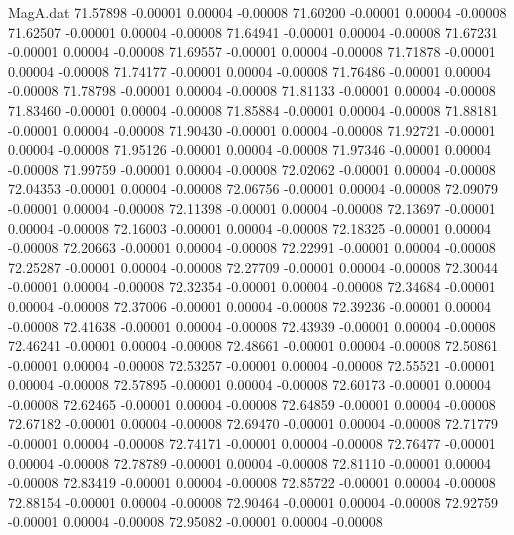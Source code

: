 \begin{filecontents}{MagA.dat}
  71.57898   -0.00001    0.00004   -0.00008
  71.60200   -0.00001    0.00004   -0.00008
  71.62507   -0.00001    0.00004   -0.00008
  71.64941   -0.00001    0.00004   -0.00008
  71.67231   -0.00001    0.00004   -0.00008
  71.69557   -0.00001    0.00004   -0.00008
  71.71878   -0.00001    0.00004   -0.00008
  71.74177   -0.00001    0.00004   -0.00008
  71.76486   -0.00001    0.00004   -0.00008
  71.78798   -0.00001    0.00004   -0.00008
  71.81133   -0.00001    0.00004   -0.00008
  71.83460   -0.00001    0.00004   -0.00008
  71.85884   -0.00001    0.00004   -0.00008
  71.88181   -0.00001    0.00004   -0.00008
  71.90430   -0.00001    0.00004   -0.00008
  71.92721   -0.00001    0.00004   -0.00008
  71.95126   -0.00001    0.00004   -0.00008
  71.97346   -0.00001    0.00004   -0.00008
  71.99759   -0.00001    0.00004   -0.00008
  72.02062   -0.00001    0.00004   -0.00008
  72.04353   -0.00001    0.00004   -0.00008
  72.06756   -0.00001    0.00004   -0.00008
  72.09079   -0.00001    0.00004   -0.00008
  72.11398   -0.00001    0.00004   -0.00008
  72.13697   -0.00001    0.00004   -0.00008
  72.16003   -0.00001    0.00004   -0.00008
  72.18325   -0.00001    0.00004   -0.00008
  72.20663   -0.00001    0.00004   -0.00008
  72.22991   -0.00001    0.00004   -0.00008
  72.25287   -0.00001    0.00004   -0.00008
  72.27709   -0.00001    0.00004   -0.00008
  72.30044   -0.00001    0.00004   -0.00008
  72.32354   -0.00001    0.00004   -0.00008
  72.34684   -0.00001    0.00004   -0.00008
  72.37006   -0.00001    0.00004   -0.00008
  72.39236   -0.00001    0.00004   -0.00008
  72.41638   -0.00001    0.00004   -0.00008
  72.43939   -0.00001    0.00004   -0.00008
  72.46241   -0.00001    0.00004   -0.00008
  72.48661   -0.00001    0.00004   -0.00008
  72.50861   -0.00001    0.00004   -0.00008
  72.53257   -0.00001    0.00004   -0.00008
  72.55521   -0.00001    0.00004   -0.00008
  72.57895   -0.00001    0.00004   -0.00008
  72.60173   -0.00001    0.00004   -0.00008
  72.62465   -0.00001    0.00004   -0.00008
  72.64859   -0.00001    0.00004   -0.00008
  72.67182   -0.00001    0.00004   -0.00008
  72.69470   -0.00001    0.00004   -0.00008
  72.71779   -0.00001    0.00004   -0.00008
  72.74171   -0.00001    0.00004   -0.00008
  72.76477   -0.00001    0.00004   -0.00008
  72.78789   -0.00001    0.00004   -0.00008
  72.81110   -0.00001    0.00004   -0.00008
  72.83419   -0.00001    0.00004   -0.00008
  72.85722   -0.00001    0.00004   -0.00008
  72.88154   -0.00001    0.00004   -0.00008
  72.90464   -0.00001    0.00004   -0.00008
  72.92759   -0.00001    0.00004   -0.00008
  72.95082   -0.00001    0.00004   -0.00008

\end{filecontents}

